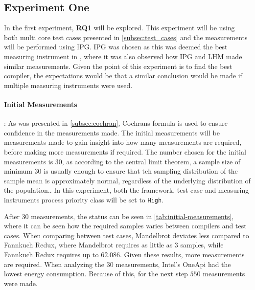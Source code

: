 \subsection{Experiment One}\label{subsec:exp_one}

In the first experiment, \textbf{RQ1} will be explored. This experiment will be using both multi core test cases presented in \cref{subsec:test_cases} and the measurements will be performed using IPG. IPG was chosen as this was deemed the best measuring instrument in \cite{biksbois}, where it was also observed how IPG and LHM made similar measurements. Given the point of this experiment is to find the best compiler, the expectations would be that a similar conclusion would be made if multiple measuring instruments were used.  

\paragraph{Initial Measurements}: As was presented in \cref{subsec:cochran}, Cochrans formula is used to ensure confidence in the measurements made. The initial measurements will be measurements made to gain insight into how many measurements are required, before making more measurements if required. The number chosen for the initial measurements is 30, as according to the central limit theorem, a sample size of minimum 30 is usually enough to ensure that teh sampling distribution of the sample mean is approximately normal, regardless of the underlying distribution of the population.\cite{central-limit-theorem}. In this experiment, both the framework, test case and measuring instruments process priority class will be set to \texttt{High}.



After 30 measurements, the status can be seen in \cref{tab:initial-measurements}, where it can be seen how the required samples varies between compilers and test cases. When comparing between test cases, Mandelbrot deviates less compared to Fannkuch Redux, where Mandelbrot requires as little as $3$ samples, while Fannkuch Redux requires up to $62.086$. Given these results, more measurements are required. When analyzing the 30 measurements, Intel's OneApi had the lowest energy consumption. Because of this, for the next step $550$ measurements were made.

%


